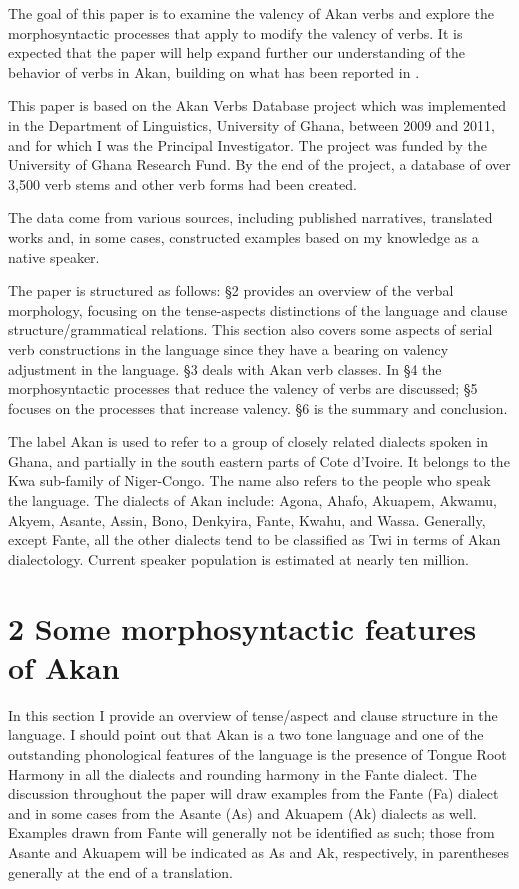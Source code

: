 \documentclass[output=paper]{langsci/langscibook}
\begin{document}
The goal of this paper is to examine the valency of Akan verbs and explore the morphosyntactic processes that apply to modify the valency of verbs. It is expected that the paper will help expand further our understanding of the behavior of verbs in Akan, building on what has been reported in \citet{Osam2008a}. 

This paper is based on the Akan Verbs Database project which was implemented in the Department of Linguistics, University of Ghana, between 2009 and 2011, and for which I was the Principal Investigator. The project was funded by the University of Ghana Research Fund. By the end of the project, a database of over 3,500 verb stems and other verb forms had been created.

The data come from various sources, including published narratives, translated works and, in some cases, constructed examples based on my knowledge as a native speaker.

The paper is structured as follows: §2 provides an overview of the verbal morphology, focusing on the tense-aspects distinctions of the language and clause structure/grammatical relations. This section also covers some aspects of serial verb constructions in the language since they have a bearing on valency adjustment in the language. §3 deals with Akan verb classes. In §4 the morphosyntactic processes that reduce the valency of verbs are discussed; §5 focuses on the processes that increase valency. §6 is the summary and conclusion.

The label Akan is used to refer to a group of closely related dialects spoken in Ghana, and partially in the south eastern parts of Cote d’Ivoire. It belongs to the Kwa sub-family of Niger-Congo. The name also refers to the people who speak the language. The dialects of Akan include: Agona, Ahafo, Akuapem, Akwamu, Akyem, Asante, Assin, Bono, Denkyira, Fante, Kwahu, and Wassa. Generally, except Fante, all the other dialects tend to be classified as Twi in terms of Akan dialectology. Current speaker population is estimated at nearly ten million.

\chapter[2  Some morphosyntactic features of Akan]{2  Some morphosyntactic features of Akan}
\begin{styleBodyTextIndent}
In this section I provide an overview of tense/aspect and clause structure in the language. I should point out that Akan is a two tone language and one of the outstanding phonological features of the language is the presence of Tongue Root Harmony in all the dialects and rounding harmony in the Fante dialect. The discussion throughout the paper will draw examples from the Fante (Fa) dialect and in some cases from the Asante (As) and Akuapem (Ak) dialects as well. Examples drawn from Fante will generally not be identified as such; those from Asante and Akuapem will be indicated as As and Ak, respectively, in parentheses generally at the end of a translation.
\end{styleBodyTextIndent}
\end{document}
